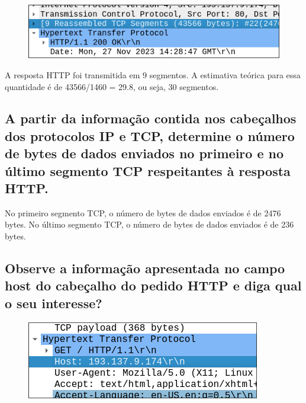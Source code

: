 \documentclass{article}
\begin{document}
\begin{figure}[h!]
    \centering
    \includegraphics[width=0.5\linewidth]{images/segments.png}
\end{figure}

A resposta HTTP foi transmitida em 9 segmentos. A estimativa teórica para essa quantidade é de 43566/1460 = 29.8, ou seja, 30 segmentos.

\subsection{A partir da informação contida nos cabeçalhos dos protocolos IP e TCP, determine o número de bytes de
dados enviados no primeiro e no último segmento TCP respeitantes à resposta HTTP.}

\begin{figure}[h!]
    \centering
    \qquad
\end{figure}

No primeiro segmento TCP, o número de bytes de dados enviados é de 2476 bytes. No último segmento TCP, o número de bytes de dados enviados é de 236 bytes.

\subsection{Observe a informação apresentada no campo host do cabeçalho do pedido HTTP e diga qual o seu
interesse?}

\begin{figure}[h!]
    \centering
    \includegraphics[width=0.5\linewidth]{images/host.png}
\end{figure}
\end{document}
